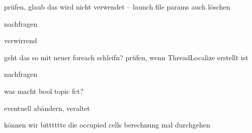 \begin{DoxyRefList}
prüfen, glaub das wird nicht verwendet -- launch file params auch löschen  
\item[\label{todo__todo000011}%
\hypertarget{todo__todo000011}{}%
Member \hyperlink{classohm__tsd__slam__ref_1_1SlamNode_a5b4ee64a1d3b1ead996762adfc95ad94}{ohm\-\_\-tsd\-\_\-slam\-\_\-ref\-:\-:Slam\-Node\-:\-:call\-Back\-Service\-Start\-Stop\-S\-L\-A\-M} (ohm\-\_\-tsd\-\_\-slam\-\_\-ref\-::\-Start\-Stop\-S\-L\-A\-M\-::\-Request \&req, ohm\-\_\-tsd\-\_\-slam\-\_\-ref\-::\-Start\-Stop\-S\-L\-A\-M\-::\-Response \&res)]nachfragen  
\item[\label{todo__todo000002}%
\hypertarget{todo__todo000002}{}%
Member \hyperlink{classohm__tsd__slam__ref_1_1SlamNode_af35bd7adca13df47579a682ab3bb827d}{ohm\-\_\-tsd\-\_\-slam\-\_\-ref\-:\-:Slam\-Node\-:\-:Slam\-Node} (void)]verwirrend  
\item[\label{todo__todo000003}%
\hypertarget{todo__todo000003}{}%
Member \hyperlink{classohm__tsd__slam__ref_1_1SlamNode_a0dbbdf08b6ac75aba94c882715d7f49e}{ohm\-\_\-tsd\-\_\-slam\-\_\-ref\-:\-:Slam\-Node\-:\-:$\sim$\-Slam\-Node} ()]geht das so mit neuer foreach schleifn? prüfen, wenn Thread\-Localize erstellt ist  
\item[\label{todo__todo000009}%
\hypertarget{todo__todo000009}{}%
Class \hyperlink{structohm__tsd__slam__ref_1_1TaggedSubscriber}{ohm\-\_\-tsd\-\_\-slam\-\_\-ref\-:\-:Tagged\-Subscriber} ]nachfragen  
\item[\label{todo__todo000010}%
\hypertarget{todo__todo000010}{}%
Member \hyperlink{structohm__tsd__slam__ref_1_1TaggedSubscriber_a6d4ad13158333a16725cdc1cdd6ab3c2}{ohm\-\_\-tsd\-\_\-slam\-\_\-ref\-:\-:Tagged\-Subscriber\-:\-:topic} (const std\-::string topic)]was macht bool topic fct?  
\item[\label{todo__todo000019}%
\hypertarget{todo__todo000019}{}%
Member \hyperlink{classohm__tsd__slam__ref_1_1ThreadGrid_a3e1350e3d4943ab408ae9b0935300972}{ohm\-\_\-tsd\-\_\-slam\-\_\-ref\-:\-:Thread\-Grid\-:\-:\-\_\-occ\-Grid\-Content} ]eventuell abändern, veraltet  
\item[\label{todo__todo000018}%
\hypertarget{todo__todo000018}{}%
Member \hyperlink{classohm__tsd__slam__ref_1_1ThreadGrid_ab5153ffea8c253924f5d5f1f05d9aa59}{ohm\-\_\-tsd\-\_\-slam\-\_\-ref\-:\-:Thread\-Grid\-:\-:event\-Loop} (void)]können wir bitttttte die occupied cells berechnung mal durchgehen 


\end{DoxyRefList}
